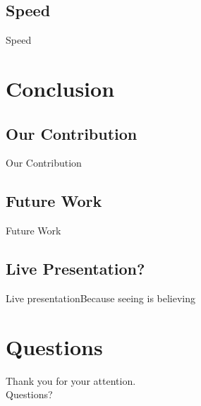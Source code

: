 \documentclass[table]{beamer}
\begin{document}
\subsection{Speed}
\begin{frame}{Speed}~\end{frame}

\section{Conclusion}
\subsection{Our Contribution}
\begin{frame}{Our Contribution}~\end{frame}
\subsection{Future Work}
\begin{frame}{Future Work}~ \end{frame}
\subsection{Live Presentation?}
\begin{frame}{Live presentation}{Because seeing is believing}\end{frame}

\section*{Questions}
\centering
\begin{frame}
  \huge Thank you for your attention.\\[1.5cm] Questions?
\end{frame}
\end{document}
